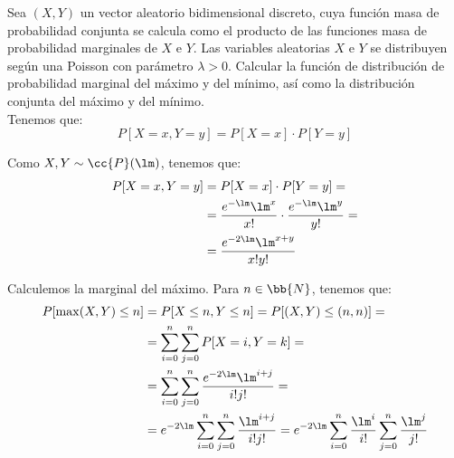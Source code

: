 \begin{ejercicio}
    Sea $(X,Y)$ un vector aleatorio bidimensional discreto, cuya función masa de probabilidad conjunta se calcula como el producto de las funciones masa de probabilidad marginales de $X$ e $Y$. Las variables aleatorias $X$ e $Y$ se distribuyen según una Poisson con parámetro $\lambda>0$. Calcular la función de distribución de probabilidad marginal del máximo y del mínimo, así como la distribución conjunta del máximo y del mínimo.\\

    Tenemos que:
    \begin{equation*}
        P[X=x,Y=y] = P[X=x]\cdot P[Y=y]
    \end{equation*}

    Como $X,Y\sim \cc{P}(\lm)$, tenemos que:
    \begin{align*}
        P[X=x,Y=y]&=P[X=x]\cdot P[Y=y]
        =\\&= \dfrac{e^{-\lm}\lm^x}{x!}\cdot \dfrac{e^{-\lm}\lm^y}{y!}
        =\\&= \dfrac{e^{-2\lm}\lm^{x+y}}{x!y!}
    \end{align*}

    Calculemos la marginal del máximo. Para $n\in\bb{N}$, tenemos que:
    \begin{align*}
        P[\max(X,Y)\leq n]&=P[X\leq n,Y\leq n]
        = P[(X,Y)\leq (n,n)]
        =\\&= \sum_{i=0}^{n}\sum_{j=0}^{n}P[X=i,Y=k]
        =\\&= \sum_{i=0}^{n}\sum_{j=0}^{n}\dfrac{e^{-2\lm}\lm^{i+j}}{i!j!}
        =\\&= e^{-2\lm}\sum_{i=0}^{n}\sum_{j=0}^{n}\dfrac{\lm^{i+j}}{i!j!}
        = e^{-2\lm}\sum_{i=0}^{n}\dfrac{\lm^i}{i!}\sum_{j=0}^{n}\dfrac{\lm^j}{j!}
    \end{align*}
\end{ejercicio}

